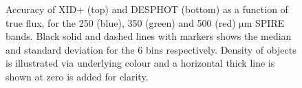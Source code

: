 \documentclass[useAMS,usenatbib]{mnras}
\begin{document}
\begin{figure}
\caption{Accuracy of \textsc{XID+} (top) and \textsc{DESPHOT} (bottom) as a function of true flux, for the 250 (blue), 350 (green) and 500 (red) $\mathrm{\mu m}$ SPIRE bands. Black solid and dashed lines with markers shows the median and standard deviation for the 6 bins respectively. Density of objects is illustrated via underlying colour and a horizontal thick line is shown at zero is added for clarity.}\label{fig:accuracy}
\end{figure}
\end{document}
